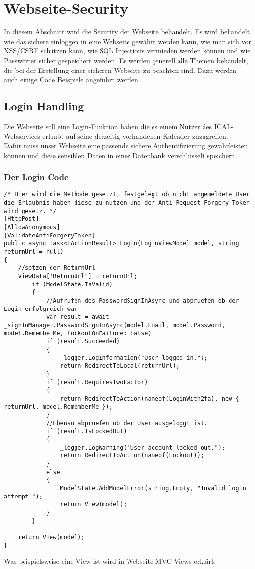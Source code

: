 \renewcommand{\theauthor}{Marcel Stering}
\chapter{Webseite-Security}
\label{sec:Security}
In diesem Abschnitt wird die Security der Webseite behandelt.
Es wird behandelt wie das sichere einloggen in eine Webseite gewährt werden kann, wie man sich vor XSS/CSRF schützen kann, wie SQL Injections vermieden werden können und wie Passwörter sicher gespeichert werden. Es werden generell alle Themen behandelt, die bei der Erstellung einer sicheren Webseite zu beachten sind. Dazu werden auch einige Code Beispiele angeführt werden.
\section{Login Handling}
\label{sec:Login}
Die Webseite soll eine Login-Funktion haben die es einem Nutzer des ICAL-Webservices erlaubt auf seine derzeitig vorhandenen Kalender zuzugreifen.\\Dafür muss unser Webseite eine passende sichere Authentifizierung gewährleisten können und diese sensiblen Daten in einer Datenbank verschlüsselt speichern. 
\subsection{Der Login Code}
\label{sec:Login_Handling_Code}
\begin{lstlisting}
/* Hier wird die Methode gesetzt, festgelegt ob nicht angemeldete User die Erlaubnis haben diese zu nutzen und der Anti-Request-Forgery-Token wird gesetz. */
[HttpPost]
[AllowAnonymous]
[ValidateAntiForgeryToken]
public async Task<IActionResult> Login(LoginViewModel model, string returnUrl = null)
{
	//setzen der ReturnUrl
    ViewData["ReturnUrl"] = returnUrl;
        if (ModelState.IsValid)
        {
        	//Aufrufen des PasswordSignInAsync und abpruefen ob der Login erfolgreich war
            var result = await _signInManager.PasswordSignInAsync(model.Email, model.Password, model.RememberMe, lockoutOnFailure: false);
            if (result.Succeeded)
            {
                _logger.LogInformation("User logged in.");
                return RedirectToLocal(returnUrl);
            }
            if (result.RequiresTwoFactor)
            {
                return RedirectToAction(nameof(LoginWith2fa), new { returnUrl, model.RememberMe });
            }
            //Ebenso abpruefen ob der User ausgeloggt ist.
            if (result.IsLockedOut)
            {
                _logger.LogWarning("User account locked out.");
                return RedirectToAction(nameof(Lockout));
            }
            else
            {
                ModelState.AddModelError(string.Empty, "Invalid login attempt.");
                return View(model);
            }
        }

    return View(model);
}
\end{lstlisting}
Was beispielsweise eine View ist wird in Webseite MVC Views erklärt. 
